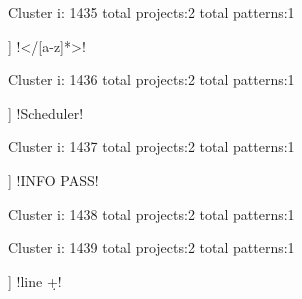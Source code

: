 Cluster i: 1435
total projects:2
total patterns:1
\begin{multicols}{1}
\begin{description}[noitemsep,topsep=0pt]
\item [[2] ] \cverb!</[a-z]*>!
\end{description}
\end{multicols}







Cluster i: 1436
total projects:2
total patterns:1
\begin{multicols}{1}
\begin{description}[noitemsep,topsep=0pt]
\item [[2] ] \cverb!Scheduler!
\end{description}
\end{multicols}







Cluster i: 1437
total projects:2
total patterns:1
\begin{multicols}{1}
\begin{description}[noitemsep,topsep=0pt]
\item [[2] ] \cverb!INFO PASS!
\end{description}
\end{multicols}







Cluster i: 1438
total projects:2
total patterns:1
\begin{multicols}{1}
\end{multicols}







Cluster i: 1439
total projects:2
total patterns:1
\begin{multicols}{1}
\begin{description}[noitemsep,topsep=0pt]
\item [[2] ] \cverb!line \d+!
\end{description}
\end{multicols}







